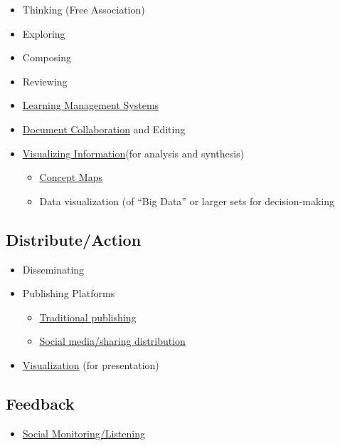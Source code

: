 \begin{itemize}
\item
  Thinking (Free Association)
\item
  Exploring
\item
  Composing
\item
  Reviewing
\end{itemize}
\begin{itemize}
\item
  \href{http://peeragogy.org/learning-management-systems/}{Learning
  Management Systems}
\item
  \href{http://peeragogy.org/document-collaborationediting/}{Document
  Collaboration} and Editing
\item
  \href{http://peeragogy.org/visualization/}{Visualizing
  Information}(for analysis and synthesis)
  \begin{itemize}
  \item
    \href{http://peeragogy.org/concept-maps/}{Concept Maps}
  \item
    Data visualization (of ``Big Data'' or larger sets for
    decision-making
  \end{itemize}
\end{itemize}
\subsection{Distribute/Action}

\begin{itemize}
\item
  Disseminating
\end{itemize}
\begin{itemize}
\item
  Publishing Platforms
  \begin{itemize}
  \item
    \href{http://peeragogy.org/traditional-publishing/}{Traditional
    publishing}
  \item
    \href{http://peeragogy.org/social-media-sharingdistribution/}{Social
    media/sharing distribution}
  \end{itemize}
\item
  \href{http://peeragogy.org/visualization/}{Visualization} (for
  presentation)
\end{itemize}
\subsection{Feedback}

\begin{itemize}
\item
  \href{http://peeragogy.org/social-listening/}{Social
  Monitoring/Listening}
\end{itemize}

